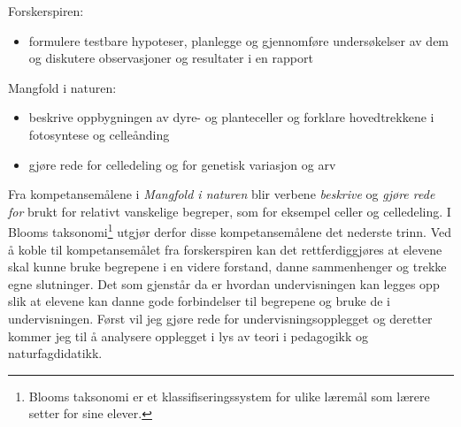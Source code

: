 \documentclass[main.tex]{subfiles}
\begin{document}
\begin{displayquote}
Forskerspiren:
\begin{itemize}
\vspace{-2mm}
\item formulere testbare hypoteser, planlegge og gjennomføre undersøkelser 
av dem og diskutere observasjoner og resultater i en rapport
\end{itemize}
Mangfold i naturen:
\begin{itemize}
\vspace{-2mm}
\item beskrive oppbygningen av dyre- og planteceller og forklare hovedtrekkene i fotosyntese 
og celleånding
\vspace{-2mm}
\item gjøre rede for celledeling og for genetisk variasjon og arv
\end{itemize}
\end{displayquote} 
Fra kompetansemålene i \emph{Mangfold i naturen} blir verbene \emph{beskrive} og \emph{gjøre rede 
for} brukt for relativt vanskelige begreper, som for eksempel celler og celledeling. I Blooms 
taksonomi\footnote[1]{Blooms taksonomi er et klassifiseringssystem for ulike læremål som lærere 
setter for sine elever.} utgjør derfor disse kompetansemålene det nederste trinn. Ved å koble til 
kompetansemålet fra forskerspiren kan det rettferdiggjøres at elevene skal kunne bruke begrepene 
i en videre forstand, danne sammenhenger og trekke egne slutninger. Det som gjenstår da er hvordan 
undervisningen kan legges opp slik at elevene kan danne gode forbindelser til begrepene og bruke 
de i undervisningen. Først vil jeg gjøre rede for undervisningsopplegget og deretter kommer jeg til 
å analysere opplegget i lys av teori i pedagogikk og naturfagdidatikk.
\end{document}
